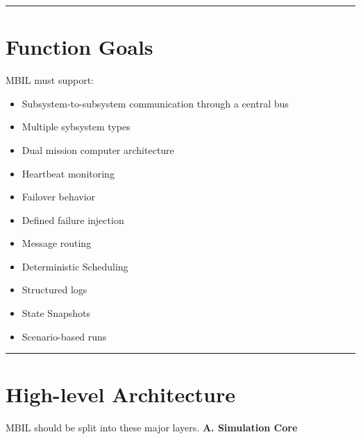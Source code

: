 \documentclass{report}
\begin{document}
\begin{center}
\rule{0.9\textwidth}{1pt}
\end{center}
\section{Function Goals}
MBIL must support:
\begin{itemize}
   \item Subsystem-to-subsystem communication through a central bus 
   \item Multiple sybsystem types 
   \item Dual mission computer architecture 
   \item Heartbeat monitoring 
   \item Failover behavior 
   \item Defined failure injection 
   \item Message routing
   \item Deterministic Scheduling 
   \item Structured logs 
   \item State Snapshots 
   \item Scenario-based runs
\end{itemize}

\begin{center}
\rule{0.9\textwidth}{1pt}
\end{center}
\section{High-level Architecture}
MBIL should be split into these major layers. 
\vspace{\baselineskip} \textbf{A. Simulation Core}
\end{document}
